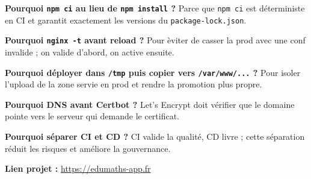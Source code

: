 \documentclass[10pt,a4paper]{article}
\begin{document}
\textbf{Pourquoi \texttt{npm ci} au lieu de \texttt{npm install} ?}
Parce que \texttt{npm ci} est d\'eterministe en CI et garantit exactement les versions du \texttt{package-lock.json}.

\textbf{Pourquoi \texttt{nginx -t} avant reload ?}
Pour \`eviter de casser la prod avec une conf invalide ; on valide d'abord, on active ensuite.

\textbf{Pourquoi d\'eployer dans \texttt{/tmp} puis copier vers \texttt{/var/www/...} ?}
Pour isoler l'upload de la zone servie en prod et rendre la promotion plus propre.

\textbf{Pourquoi DNS avant Certbot ?}
Let's Encrypt doit v\'erifier que le domaine pointe vers le serveur qui demande le certificat.

\textbf{Pourquoi s\'eparer CI et CD ?}
CI valide la qualit\'e, CD livre ; cette s\'eparation r\'eduit les risques et am\'eliore la gouvernance.

\vspace{0.2em}
\textbf{Lien projet :} \href{https://edumaths-app.fr}{https://edumaths-app.fr}
\end{document}
